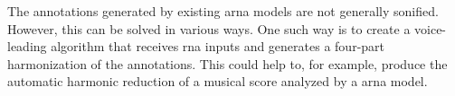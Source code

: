 
The annotations generated by existing \gls{arna} models are
not generally sonified. However, this can be solved in
various ways. One such way is to create a voice-leading
algorithm that receives \gls{rna} inputs and generates a
four-part harmonization of the annotations. This could help
to, for example, produce the automatic harmonic reduction of
a musical score analyzed by a \gls{arna} model.
